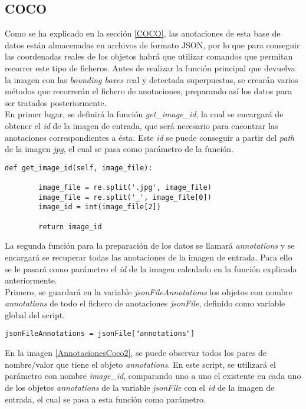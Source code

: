 \documentclass[a4paper, 12pt, spanish, chapterprefix, numbers=noenddot]{book}
\begin{document}
\subsection{COCO}\label{CompareCOCO}

Como se ha explicado en la sección \ref{COCO}, las anotaciones de esta base de datos están almacenadas en archivos de formato JSON, por lo que para conseguir las coordenadas reales de los objetos habrá que utilizar comandos que permitan recorrer este tipo de ficheros. Antes de realizar la función principal que devuelva la imagen con las \textit{bounding boxes} real y detectada superpuestas, se crearán varios métodos que recorrerán el fichero de anotaciones, preparando así los datos para ser tratados posteriormente.\\

En primer lugar, se definirá la función \textit{get\_image\_id}, la cual se encargará de obtener el \textit{id} de la imagen de entrada, que será necesario para encontrar las anotaciones correspondientes a ésta. Este \textit{id} se puede conseguir a partir del \textit{path} de la imagen \textit{jpg}, el cual se pasa como parámetro de la función.\\

\begin{lstlisting}[frame=single]
def get_image_id(self, image_file):

        image_file = re.split('.jpg', image_file)
        image_file = re.split('_', image_file[0])
        image_id = int(image_file[2])

        return image_id
\end{lstlisting}

La segunda función para la preparación de los datos se llamará \textit{annotations} y se encargará se recuperar todas las anotaciones de la imagen de entrada. Para ello se le pasará como parámetro el \textit{id} de la imagen calculado en la función explicada anteriormente.\\

Primero, se guardará en la variable \textit{jsonFileAnnotations} los objetos con nombre \textit{annotations} de todo el fichero de anotaciones \textit{jsonFile}, definido como variable global del script.\\

\begin{lstlisting}[frame=single]
jsonFileAnnotations = jsonFile["annotations"]
\end{lstlisting}

En la imagen \ref{AnnotacionesCoco2}, se puede observar todos los pares de nombre/valor que tiene el objeto \textit{annotations}. En este script, se utilizará el parámetro con nombre \textit{image\_id}, comparando uno a uno el existente en cada uno de los objetos \textit{annotations} de la variable \textit{jsonFile} con el \textit{id} de la imagen de entrada, el cual se pasa a esta función como parámetro.\\
\end{document}
